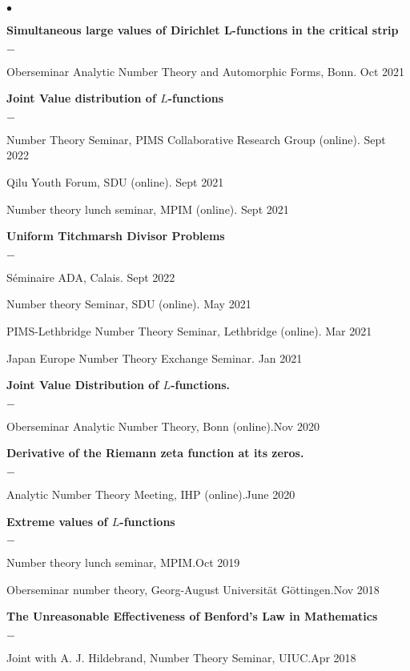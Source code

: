 \documentclass[margin,line,pifont,palatino,courier,10pt]{res}
\newenvironment{list1}{
  \begin{list}{$\bullet$}{%
      \setlength{\itemsep}{0in}
      \setlength{\parsep}{0in} \setlength{\parskip}{0in}
      \setlength{\topsep}{0in} \setlength{\partopsep}{0in}
      \setlength{\leftmargin}{0.17in}}}{\end{list}}
\newenvironment{list2}{
  \begin{list}{$-$}{%
      \setlength{\itemsep}{0in}
      \setlength{\parsep}{0in} \setlength{\parskip}{0in}
      \setlength{\topsep}{0in} \setlength{\partopsep}{0in}
      \setlength{\leftmargin}{0.2in}}}{\end{list}}
\begin{document}
\begin{resume}
\begin{list1}
\item \textbf{Simultaneous large values of Dirichlet L-functions in the critical strip}
\begin{list2}
	\item {Oberseminar Analytic Number Theory and Automorphic Forms, Bonn}. {\hfill Oct 2021}
\end{list2}
\item \textbf{Joint Value distribution of $L$-functions}
\begin{list2}
	\item {Number Theory Seminar, PIMS Collaborative Research Group (online)}. {\hfill Sept 2022}
	\item {Qilu Youth Forum, SDU (online)}. {\hfill Sept 2021}
    \item {Number theory lunch seminar, MPIM (online)}. {\hfill Sept 2021}
\end{list2} 
\item \textbf{Uniform Titchmarsh Divisor Problems}
\begin{list2}
	\item {S\'eminaire ADA, Calais}. {\hfill Sept 2022}
	\item {Number theory Seminar, SDU (online)}. {\hfill May 2021}
	\item {PIMS-Lethbridge Number Theory Seminar, Lethbridge (online)}. {\hfill Mar 2021}
	\item {Japan Europe Number Theory Exchange Seminar}. {\hfill Jan 2021}
\end{list2} 
\item \textbf{ Joint Value Distribution of $L$-functions.} 
\begin{list2}
	\item {Oberseminar Analytic Number Theory, Bonn (online)}.{\hfill Nov 2020}
\end{list2}
\item \textbf{ Derivative of the Riemann zeta function at its zeros.}
\begin{list2}
	 \item {Analytic Number Theory Meeting, IHP (online)}.{\hfill June 2020}
	 
\end{list2}

\item \textbf{Extreme values of $L$-functions}
\begin{list2}
	\item { Number theory lunch seminar, MPIM}.{\hfill Oct 2019}
	\item {Oberseminar number theory, Georg-August Universit\"at G\"ottingen}.{\hfill Nov 2018}
\end{list2}
 \item \textbf{The Unreasonable Effectiveness of Benford's Law in Mathematics}
 \begin{list2}
 	\item Joint with A. J. Hildebrand, Number Theory Seminar, UIUC.{\hfill Apr 2018}
 \end{list2}
 

\end{list1}
\end{resume}
\end{document}
